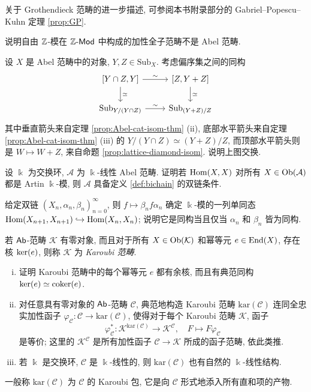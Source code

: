 关于 Grothendieck 范畴的进一步描述, 可参阅本书附录部分的 Gabriel--Popescu--Kuhn 定理 \ref{prop:GP}.

\vfill
\begin{Exercises}
	\item 说明自由 $\mathbb{Z}$-模在 $\mathbb{Z}\text{-}\mathsf{Mod}$ 中构成的加性全子范畴不是 Abel 范畴.
	
	\item 设 $X$ 是 Abel 范畴中的对象, $Y, Z \in \mathrm{Sub}_X$. 考虑偏序集之间的同构
	\[\begin{tikzcd}
		\left[Y \cap Z, Y \right] \arrow[d, "\simeq"] \arrow[r, "\sim"] & \left[ Z, Y+Z \right] \arrow[d, "\simeq"] \\
		\mathrm{Sub}_{Y/(Y \cap Z)} \arrow[r, "\sim"] & \mathrm{Sub}_{(Y+Z)/Z}
	\end{tikzcd}\]
	其中垂直箭头来自定理 \ref{prop:Abel-cat-isom-thm} (ii), 底部水平箭头来自定理 \ref{prop:Abel-cat-isom-thm} (iii) 的 $Y/(Y \cap Z) \simeq (Y+Z)/Z$, 而顶部水平箭头则是 $W \mapsto W + Z$, 来自命题 \ref{prop:lattice-diamond-isom}. 说明上图交换.

	\item 设 $\Bbbk$ 为交换环, $\mathcal{A}$ 为 $\Bbbk$-线性 Abel 范畴. 证明若 $\operatorname{Hom}(X, X)$ 对所有 $X \in \operatorname{Ob}(\mathcal{A})$ 都是 Artin $\Bbbk$-模, 则 $\mathcal{A}$ 具备定义 \ref{def:bichain} 的双链条件.
	\begin{hint}
		给定双链 $(X_n, \alpha_n, \beta_n)_{n=0}^\infty$, 则 $f \mapsto \beta_n f \alpha_n$ 确定 $\Bbbk$-模的一列单同态 $\operatorname{Hom}(X_{n+1}, X_{n+1}) \hookrightarrow \operatorname{Hom}(X_n, X_n)$; 说明它是同构当且仅当 $\alpha_n$ 和 $\beta_n$ 皆为同构.
	\end{hint}

	\item 若 $\mathsf{Ab}$-范畴 $\mathcal{K}$ 有零对象, 而且对于所有 $X \in \operatorname{Ob}(\mathcal{K})$ 和幂等元 $e \in \operatorname{End}(X)$, 存在核 $\operatorname{ker}(e)$, 则称 $\mathcal{K}$ 为 \emph{Karoubi 范畴}.
	\begin{enumerate}[(i)]
		\item 证明 Karoubi 范畴中的每个幂等元 $e$ 都有余核, 而且有典范同构 $\operatorname{ker}(e) \simeq \operatorname{coker}(e)$.
		\item 对任意具有零对象的 $\mathsf{Ab}$-范畴 $\mathcal{C}$, 典范地构造 Karoubi 范畴 $\mathrm{kar}(\mathcal{C})$ 连同全忠实加性函子 $\varphi_{\mathcal{C}}: \mathcal{C} \to \mathrm{kar}(\mathcal{C})$, 使得对于每个 Karoubi 范畴 $\mathcal{K}$, 函子
		\[ \varphi_{\mathcal{C}}^*: \mathcal{K}^{\mathrm{kar}(\mathcal{C})} \to \mathcal{K}^{\mathcal{C}}, \quad F \mapsto F\varphi_{\mathcal{C}} \]
		是等价; 这里的 $\mathcal{K}^{\mathcal{C}}$ 是所有加性函子 $\mathcal{C} \to \mathcal{K}$ 所成的函子范畴, 依此类推.
		\item 若 $\Bbbk$ 是交换环, $\mathcal{C}$ 是 $\Bbbk$-线性的, 则 $\mathrm{kar}(\mathcal{C})$ 也有自然的 $\Bbbk$-线性结构.
	\end{enumerate}
	一般称 $\mathrm{kar}(\mathcal{C})$ 为 $\mathcal{C}$ 的 Karoubi 包, 它是向 $\mathcal{C}$ 形式地添入所有直和项的产物.
	

\end{Exercises}
